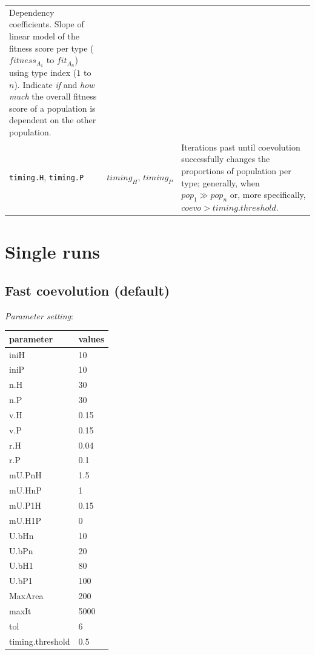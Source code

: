 \documentclass[]{book}
\begin{document}
\begin{longtable}[]{@{}lll@{}}
\begin{minipage}[t]{0.34\columnwidth}
Dependency coefficients. Slope of linear model of the fitness score per type (\(fitness_{A_1}\) to \(fit_{A_n}\)) using type index (\(1\) to \(n\)). Indicate \emph{if} and \emph{how much} the overall fitness score of a population is dependent on the other population.\strut
\end{minipage}\tabularnewline
\begin{minipage}[t]{0.36\columnwidth}\raggedright
\texttt{timing.H}, \texttt{timing.P}\strut
\end{minipage} & \begin{minipage}[t]{0.21\columnwidth}\raggedright
\(timing_{H},\,timing_{P}\)\strut
\end{minipage} & \begin{minipage}[t]{0.34\columnwidth}\raggedright
Iterations past until coevolution successfully changes the proportions of population per type; generally, when \(pop_1\gg pop_n\) or, more specifically, \(coevo>timing.threshold\).\strut
\end{minipage}\tabularnewline
\bottomrule
\end{longtable}

\hypertarget{single-runs}{%
\chapter{Single runs}\label{single-runs}}

\newpage

\hypertarget{fast-coevolution-default}{%
\section{Fast coevolution (default)}\label{fast-coevolution-default}}

\emph{Parameter setting}:

\begin{tabular}{l|l}
\hline
parameter & values\\
\hline
iniH & 10\\
\hline
iniP & 10\\
\hline
n.H & 30\\
\hline
n.P & 30\\
\hline
v.H & 0.15\\
\hline
v.P & 0.15\\
\hline
r.H & 0.04\\
\hline
r.P & 0.1\\
\hline
mU.PnH & 1.5\\
\hline
mU.HnP & 1\\
\hline
mU.P1H & 0.15\\
\hline
mU.H1P & 0\\
\hline
U.bHn & 10\\
\hline
U.bPn & 20\\
\hline
U.bH1 & 80\\
\hline
U.bP1 & 100\\
\hline
MaxArea & 200\\
\hline
maxIt & 5000\\
\hline
tol & 6\\
\hline
timing.threshold & 0.5\\
\hline
\end{tabular}
\end{document}
